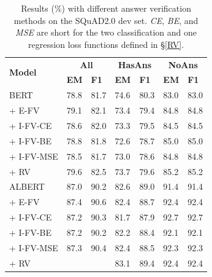 \documentclass[letterpaper]{article} %
\begin{document}
\begin{table}
	\begin{center}
		\setlength{\tabcolsep}{5pt}
		{
			\begin{tabular}{lllllll}
				\toprule
				\multirow{2}{*}{\textbf{Model}} & \multicolumn{2}{c}{\textbf{All}} & \multicolumn{2}{c}{\textbf{HasAns}} & \multicolumn{2}{c}{\textbf{NoAns}} \\
				& \textbf{EM} & \textbf{F1} & \textbf{EM} & \textbf{F1} & \textbf{EM} & \textbf{F1} \\

				\midrule
				BERT  & 78.8 & 81.7  & 74.6 & 80.3 & 83.0 & 83.0 \\
				\quad     + E-FV  & 79.1 & 82.1 & 73.4 & 79.4  & 84.8 & 84.8  \\
				\quad     + I-FV-CE  & 78.6 & 82.0 & 73.3 & 79.5 & 84.5 & 84.5\\
				\quad + I-FV-BE & 78.8 & 81.8 & 72.6 & 78.7 & 85.0 & 85.0\\
				\quad     + I-FV-MSE  & 78.5 & 81.7& 73.0 & 78.6 & 84.8 & 84.8  \\
				\quad     + RV  & 79.6 & 82.5 & 73.7 & 79.6  & 85.2 & 85.2  \\
				\midrule
				ALBERT  &  87.0 & 90.2 & 82.6 & 89.0 & 91.4 &  91.4  \\
				\quad     + E-FV  & 87.4 & 90.6  & 82.4 & 88.7  & 92.4 &  92.4\\
				\quad   + I-FV-CE  & 87.2 & 90.3 & 81.7 & 87.9 & 92.7 & 92.7 \\
				\quad + I-FV-BE & 87.2 & 90.2 &82.2 &88.4 &92.1 &92.1 \\
				\quad     + I-FV-MSE & 87.3 & 90.4 & 82.4 & 88.5 & 92.3 & 92.3 \\
				\quad      + RV  & \text{87.8} & \text{90.9}  & 83.1 & 89.4 &92.4  &  92.4 \\
				\bottomrule
			\end{tabular}
		}
	\end{center}
	\caption{\label{tablescore} Results (\%) with different answer verification methods on the SQuAD2.0 dev set. \textit{CE}, \textit{BE}, and \textit{MSE} are short for the two classification and one regression loss functions defined in \S\ref{RV}.}
\end{table}
\end{document}

